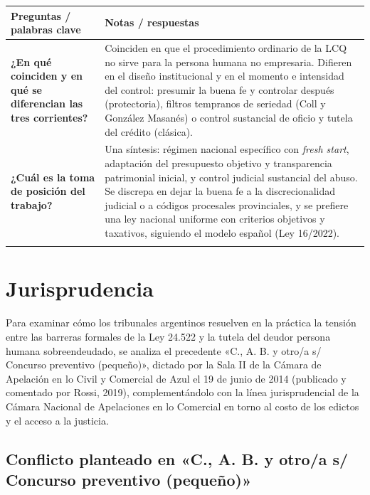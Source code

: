 \documentclass[12pt,oneside]{book}
\makeatletter
\newcommand{\cornellrow}[2]{\textbf{#1} & #2 \\ \addlinespace[0.8em]}
\newenvironment{cornell}[1]{%
    \par\medskip
    \noindent{\large\bfseries Cuadro Cornell --- #1}\par\smallskip
    \begin{longtable}{@{}>{\raggedright\arraybackslash}p{0.25\textwidth}>{\raggedright\arraybackslash}p{0.69\textwidth}@{}}
    \toprule
    \textbf{Preguntas / palabras clave} & \textbf{Notas / respuestas} \\
    \midrule
    \endhead
}{%
    \bottomrule
    \end{longtable}
}
\newcommand{\cornellsummary}[1]{%
    \midrule
    \multicolumn{2}{@{}p{\dimexpr0.94\textwidth+2\tabcolsep\relax}@{}}{\textbf{Resumen:} #1} \\
}
\makeatother
\begin{document}
\begin{cornell}{Doctrina}
\cornellrow{¿En qué coinciden y en qué se diferencian las tres corrientes?}{Coinciden en que el procedimiento ordinario de la LCQ no sirve para la persona humana no empresaria. Difieren en el diseño institucional y en el momento e intensidad del control: presumir la buena fe y controlar después (protectoria), filtros tempranos de seriedad (Coll y González Masanés) o control sustancial de oficio y tutela del crédito (clásica).}
\cornellrow{¿Cuál es la toma de posición del trabajo?}{Una síntesis: régimen nacional específico con \textit{fresh start}, adaptación del presupuesto objetivo y transparencia patrimonial inicial, y control judicial sustancial del abuso. Se discrepa en dejar la buena fe a la discrecionalidad judicial o a códigos procesales provinciales, y se prefiere una ley nacional uniforme con criterios objetivos y taxativos, siguiendo el modelo español (Ley 16/2022).}
\cornellsummary{La doctrina argentina converge en que el molde empresarial de la LCQ es inadecuado para la persona humana no empresaria, pero se divide en el modo de controlar el abuso: presunción de buena fe y control posterior, filtros tempranos de seriedad o control judicial sustancial de oficio. El trabajo adopta una síntesis y propone una ley nacional uniforme con criterios objetivos de buena fe.}
\end{cornell}

\chapter[Jurisprudencia]{Jurisprudencia}

Para examinar cómo los tribunales argentinos resuelven en la práctica la tensión entre las barreras formales de la Ley 24.522 y la tutela del deudor persona humana sobreendeudado, se analiza el precedente «C., A. B. y otro/a s/ Concurso preventivo (pequeño)», dictado por la Sala II de la Cámara de Apelación en lo Civil y Comercial de Azul el 19 de junio de 2014 (publicado y comentado por Rossi, 2019), complementándolo con la línea jurisprudencial de la Cámara Nacional de Apelaciones en lo Comercial en torno al costo de los edictos y el acceso a la justicia.

\section{Conflicto planteado en «C., A. B. y otro/a s/ Concurso preventivo (pequeño)»}
\end{document}
